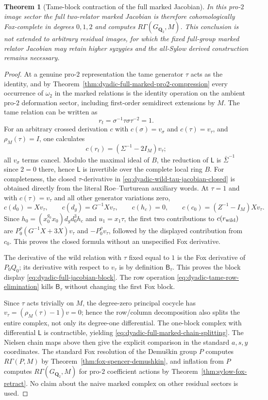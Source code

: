 \documentclass[11pt]{article}
\newtheorem{theorem}{Theorem}[section]
\theoremstyle{definition}
\begin{document}
\begin{theorem}[Tame-block contraction of the full marked Jacobian]
In this pro-$2$ image sector the full
two-relator marked Jacobian is therefore
cohomologically Fox-complete in degrees
$0,1,2$ and computes
$R\Gamma(G_{\mathbf Q_2},M)$.
This conclusion is \emph{not} extended to
arbitrary residual images, for which
the fixed full-group marked relator
Jacobian may retain higher syzygies
and the all-Sylow derived construction
remains necessary.
\end{theorem}

\begin{proof}
At a genuine pro-$2$ representation the
tame generator $\tau$ acts as the identity,
and by Theorem~\ref{thm:dyadic-full-marked-pro2-compression}
every occurrence of $\omega_2$ in the
marked relations is the identity
operation on the ambient pro-$2$
deformation sector, including first-order
semidirect extensions by $M$.
The tame relation can be written as
\[
 r_t=\sigma^{-1}\tau\sigma\tau^{-2}=1.
\]
For an arbitrary crossed derivation $c$
with $c(\sigma)=v_\sigma$ and
$c(\tau)=v_\tau$, and
$\rho_M(\tau)=I$, one calculates
\[
 c(r_t)=(\Sigma^{-1}-2I_M)v_\tau;
\]
all $v_\sigma$ terms cancel.
Modulo the maximal ideal of $B$,
the reduction of $\mathsf L$ is
$\bar\Sigma^{-1}$ since $2=0$ there,
hence $\mathsf L$ is invertible over
the complete local ring $B$.
For completeness, the closed
$\tau$-derivative in
\eqref{eq:dyadic-wild-tau-jacobian-closed}
is obtained directly from the literal
Roe--Turturean auxiliary words.
At $\tau=1$ and with $c(\tau)=v_\tau$
and all other generator variations zero,
\[
c(d_0)=Xv_\tau,\qquad
c(d_g)=G^{-1}Xv_\tau,\qquad
c(h_c)=0,\qquad
c(c_0)=(Z^{-1}-I_M)Xv_\tau.
\]
Since $h_0=(x_0^{g_0}x_0)d_gd_0^3h_c$
and $u_1=x_1\tau$, the first two
contributions to $c(r_{\rm wild})$ are
$P_0^\rho(G^{-1}X+3X)v_\tau$
and $-P_0^\rho v_\tau$, followed by
the displayed contribution from $c_0$.
This proves the closed formula
without an unspecified Fox derivative.

The derivative of the wild relation
with $\tau$ fixed equal to $1$ is
the Fox derivative of $P_0Q_0$;
its derivative with respect to
$v_\tau$ is by definition
$\mathsf B_\tau$.  This proves the
block display
\eqref{eq:dyadic-full-jacobian-block}.
The row operation
\eqref{eq:dyadic-tame-row-elimination}
kills $\mathsf B_\tau$ without changing
the first Fox block.

Since $\tau$ acts trivially on $M$,
the degree-zero principal cocycle has
$v_\tau=(\rho_M(\tau)-1)v=0$;
hence the row/column decomposition
also splits the entire complex,
not only its degree-one differential.
The one-block complex with differential
$\mathsf L$ is contractible, yielding
\eqref{eq:dyadic-full-marked-chain-splitting}.
The Nielsen chain maps above then give
the explicit comparison in the standard
$a,s,y$ coordinates.
The standard Fox resolution of the
Demu\v{s}kin group $P$ computes
$R\Gamma(P,M)$ by
Theorem~\ref{thm:fox-spencer-demushkin},
and inflation from $P$ computes
$R\Gamma(G_{\mathbf Q_2},M)$ for
pro-$2$ coefficient actions by
Theorem~\ref{thm:sylow-fox-retract}.
No claim about the naive marked complex
on other residual sectors is used.
\end{proof}
\end{document}
